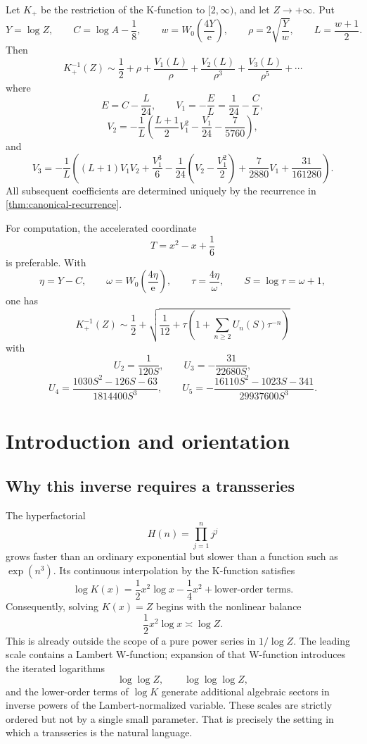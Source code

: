 \documentclass[11pt,a4paper]{article}
\numberwithin{equation}{section}
\theoremstyle{remark}
\newcommand{\e}{\mathrm e}
\newcommand{\Kinv}{K_{+}^{-1}}
\begin{document}
\begin{mainresult}
Let \(K_+\) be the restriction of the K-function to \([2,\infty)\), and let
\(Z\to+\infty\).  Put
\[
Y=\log Z,\qquad C=\log A-\frac18,
\qquad w=W_0\!\left(\frac{4Y}{\e}\right),
\qquad \rho=2\sqrt{\frac{Y}{w}},
\qquad L=\frac{w+1}{2}.
\]
Then
\[
\boxed{
\Kinv(Z)\sim \frac12+\rho+
\frac{V_1(L)}{\rho}+
\frac{V_2(L)}{\rho^3}+
\frac{V_3(L)}{\rho^5}+\cdots
}
\]
where
\[
E=C-\frac{L}{24},\qquad
V_1=-\frac{E}{L}=\frac1{24}-\frac{C}{L},
\]
\[
V_2=-\frac1L\left(\frac{L+1}{2}V_1^2-\frac{V_1}{24}-\frac7{5760}\right),
\]
and
\[
V_3=-\frac1L\left((L+1)V_1V_2+\frac{V_1^3}{6}
-\frac1{24}\left(V_2-\frac{V_1^2}{2}\right)
+\frac7{2880}V_1+\frac{31}{161280}\right).
\]
All subsequent coefficients are determined uniquely by the recurrence in
\cref{thm:canonical-recurrence}.

For computation, the accelerated coordinate
\[
T=x^2-x+\frac16
\]
is preferable.  With
\[
\eta=Y-C,
\qquad \omega=W_0\!\left(\frac{4\eta}{\e}\right),
\qquad \tau=\frac{4\eta}{\omega},
\qquad S=\log\tau=\omega+1,
\]
one has
\[
\boxed{
\Kinv(Z)\sim \frac12+
\sqrt{\frac1{12}+\tau\left(1+
\sum_{n\ge2}U_n(S)\tau^{-n}\right)}
}
\]
with
\[
U_2=\frac{1}{120S},\qquad
U_3=-\frac{31}{22680S},
\]
\[
U_4=\frac{1030S^2-126S-63}{1814400S^3},\qquad
U_5=-\frac{16110S^2-1023S-341}{29937600S^3}.
\]
\end{mainresult}

\section{Introduction and orientation}

\subsection{Why this inverse requires a transseries}

The hyperfactorial
\[
H(n)=\prod_{j=1}^{n}j^j
\]
grows faster than an ordinary exponential but slower than a function such as
\(\exp(n^3)\).  Its continuous interpolation by the K-function satisfies
\[
\log K(x)=\frac12x^2\log x-\frac14x^2+\text{lower-order terms}.
\]
Consequently, solving \(K(x)=Z\) begins with the nonlinear balance
\[
\frac12x^2\log x\asymp \log Z.
\]
This is already outside the scope of a pure power series in \(1/\log Z\).
The leading scale contains a Lambert W-function; expansion of that W-function
introduces the iterated logarithms
\[
\log\log Z,\qquad \log\log\log Z,
\]
and the lower-order terms of \(\log K\) generate additional algebraic sectors
in inverse powers of the Lambert-normalized variable.  These scales are
strictly ordered but not by a single small parameter.  That is precisely the
setting in which a transseries is the natural language.
\end{document}
